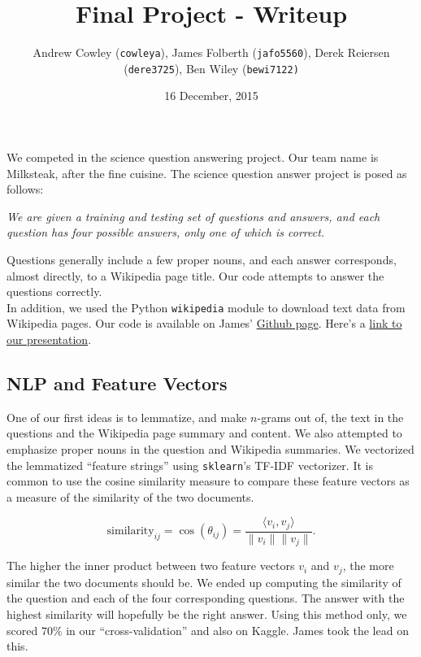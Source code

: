 \documentclass{article}
\title{Final Project - Writeup}
\date{\small 16 December, 2015}
\author{\normalsize Andrew Cowley (\texttt{cowleya}), James Folberth (\texttt{jafo5560}), Derek Reiersen (\texttt{dere3725}), Ben Wiley (\texttt{bewi7122)}}
\theoremstyle{mystuff}
\theoremstyle{myexample}
\theoremstyle{named}
\begin{document}
\maketitle

We competed in the science question answering project.  Our team name is Milksteak, after the fine cuisine. The science question answer project is posed as follows: 

\begin{center}
    \parbox{0.65\linewidth}{%
        \textit{We are given a training and testing set of questions and answers, and each question has four possible answers, only one of which is correct.}
    }
\end{center}

Questions generally include a few proper nouns, and each answer corresponds, almost directly, to a Wikipedia page title.  Our code attempts to answer the questions correctly. \\

In addition, we used the Python \texttt{wikipedia} module to download text data from Wikipedia pages.  Our code is available on James' \href{https://github.com/jamesfolberth/ml_project}{Github page}.  Here's a \href{https://www.youtube.com/watch?v=W-eg617wNO8}{link to our presentation}.\\

\subsection{NLP and Feature Vectors}
\label{ssec:nlp}
One of our first ideas is to lemmatize, and make $n$-grams out of, the text in the questions and the Wikipedia page summary and content.  We also attempted to emphasize proper nouns in the question and Wikipedia summaries.  We vectorized the lemmatized ``feature strings'' using \texttt{sklearn}'s TF-IDF vectorizer.  It is common to use the cosine similarity measure to compare these feature vectors as a measure of the similarity of the two documents.

\[ \text{similarity}_{ij} = \cos(\theta_{ij}) = \dfrac{\langle v_i, v_j\rangle}{\|v_i\|\|v_j\|}. \] 

\noindent The higher the inner product between two feature vectors $v_i$ and $v_j$, the more similar the two documents should be.  We ended up computing the similarity of the question and each of the four corresponding questions.  The answer with the highest similarity will hopefully be the right answer.  Using this method only, we scored $70\%$ in our ``cross-validation'' and also on Kaggle.  James took the lead on this.\\
\end{document}
